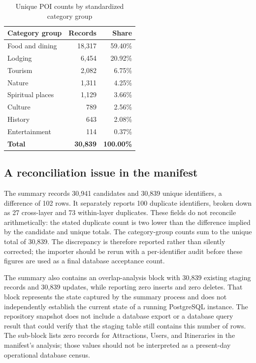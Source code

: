 \begin{table}[htbp]
    \centering
    \caption{Unique POI counts by standardized category group}
    \label{tab:osm_group_profile}
    \renewcommand{\arraystretch}{1.2}
    \begin{tabularx}{0.78\textwidth}{>{\raggedright\arraybackslash}X r r}
        \toprule
        \textbf{Category group} & \textbf{Records} & \textbf{Share} \\
        \midrule
        Food and dining & 18,317 & 59.40\% \\
        Lodging & 6,454 & 20.92\% \\
        Tourism & 2,082 & 6.75\% \\
        Nature & 1,311 & 4.25\% \\
        Spiritual places & 1,129 & 3.66\% \\
        Culture & 789 & 2.56\% \\
        History & 643 & 2.08\% \\
        Entertainment & 114 & 0.37\% \\
        \midrule
        \textbf{Total} & \textbf{30,839} & \textbf{100.00\%} \\
        \bottomrule
    \end{tabularx}
\end{table}

\subsection{A reconciliation issue in the manifest}

The summary records 30,941 candidates and 30,839 unique identifiers, a difference of 102 rows. It separately reports 100 duplicate identifiers, broken down as 27 cross-layer and 73 within-layer duplicates. These fields do not reconcile arithmetically: the stated duplicate count is two lower than the difference implied by the candidate and unique totals. The category-group counts sum to the unique total of 30,839. The discrepancy is therefore reported rather than silently corrected; the importer should be rerun with a per-identifier audit before these figures are used as a final database acceptance count.

The summary also contains an overlap-analysis block with 30,839 existing staging records and 30,839 updates, while reporting zero inserts and zero deletes. That block represents the state captured by the summary process and does not independently establish the current state of a running PostgreSQL instance. The repository snapshot does not include a database export or a database query result that could verify that the staging table still contains this number of rows. The  sub-block lists zero records for Attractions, Users, and Itineraries in the manifest's analysis; those values should not be interpreted as a present-day operational database census.

